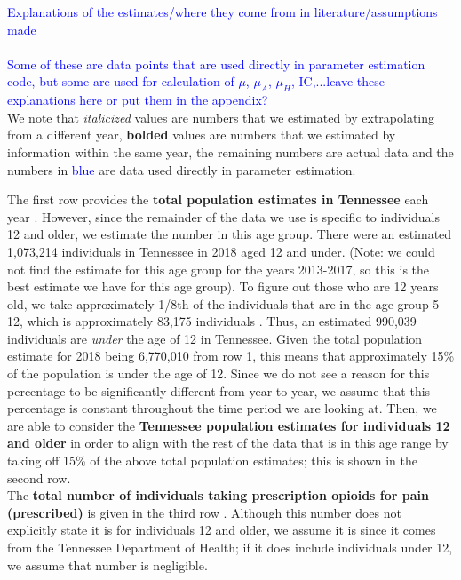 \documentclass[12pt]{article}
\begin{document}
\label{tab:template}
 \textcolor{blue}{Explanations of the estimates/where they come from in literature/assumptions made} \\ \\
 \textcolor{blue}{Some of these are data points that are used directly in parameter estimation code, but some are used for calculation of $\mu$, $\mu_A$, $\mu_H$, IC,...leave these explanations here or put them in the appendix?} \\
We note that \textit{italicized} values are numbers that we estimated by extrapolating from a different year, \textbf{bolded} values are numbers that we estimated by information within the same year, the remaining numbers are actual data and the numbers in \textcolor{blue}{blue} are data used directly in parameter estimation.
 
The first row provides the \textbf{total population estimates in Tennessee} each year \cite{USCensus}. 
However, since the remainder of the data we use is specific to individuals 12 and older, we estimate the number in this age group. 
There were an estimated 1,073,214 individuals in Tennessee in 2018 aged 12 and under. (Note: we could not find the estimate for this age group for the years 2013-2017, so this is the best estimate we have for this age group). To figure out those who are 12 years old, we take approximately 1/8th of the individuals that are in the age group 5-12, which is approximately 83,175 individuals \cite{DOHHS}. Thus, an estimated 990,039 individuals are \emph{under} the age of 12 in Tennessee. Given the total population estimate for 2018 being 6,770,010 from row 1, this means that approximately 15\% of the population is under the age of 12. Since we do not see a reason for this percentage to be significantly different from year to year, we assume that this percentage is constant throughout the time period we are looking at. Then, we are able to consider the \textbf{Tennessee population estimates for individuals 12 and older} in order to align with the rest of the data that is in this age range by taking off 15\% of the above total population estimates; this is shown in the second row.  \\

The \textbf{total number of individuals taking prescription opioids for pain (prescribed)} is given in the third row \cite{TNgov1}. Although this number does not explicitly state it is for individuals 12 and older, we assume it is since it comes from the Tennessee Department of Health; if it does include individuals under 12, we assume that number is negligible. \\
\end{document}
